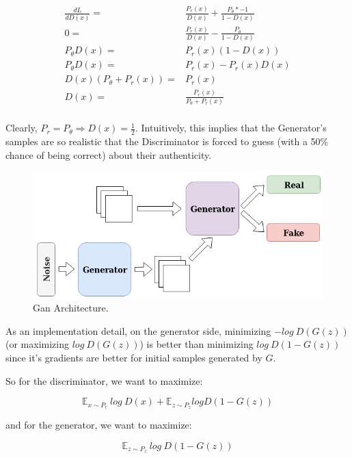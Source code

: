\begin{align*}
	\label{eq:optD}
	\frac{d L}{d D(x)} =& \frac{P_r(x)}{D(x)} + \frac{P_\theta * -1}{1-D(x)} \\
	0 =& \frac{P_r(x)}{D(x)} - \frac{P_\theta}{1-D(x)} \\
	P_\theta D(x) =& P_r(x) (1-D(x)) \\
	P_\theta D(x) =& P_r(x)-P_r(x) D(x) \\
	D(x)(P_\theta + P_r(x)) =& P_r(x)\\
	D(x) =& \frac{P_r(x)}{P_\theta + P_r(x)}\\
\end{align*}

Clearly, $P_r = P_\theta \Rightarrow D(x) = \frac{1}{2}$. Intuitively, this implies that the Generator's samples are so realistic that the Discriminator is forced to guess (with a 50\% chance of being correct) about their authenticity. 

\begin{figure}[h!]
	\centering
	\includegraphics[width=\linewidth]{media/gan.png}
	\caption{Gan Architecture.}
	\label{fig:gan}
\end{figure}

As an implementation detail, on the generator side, minimizing $-log~D(G(z))$ (or maximizing $log~D(G(z))$) is better than minimizing $log~D(1-G(z))$ since it's gradients are better for initial samples generated by $G$.

So for the discriminator, we want to maximize:

\begin{equation}
	\label{eq:maxD}
	\mathbb{E}_{x \sim P_r}~log~D(x) + \mathbb{E}_{z \sim P_z} log D(1-G(z))
\end{equation}

and for the generator, we want to maximize:

\begin{equation}
	\label{eq:maxG}
	\mathbb{E}_{z \sim P_z}~log~D(1-G(z))
\end{equation}

